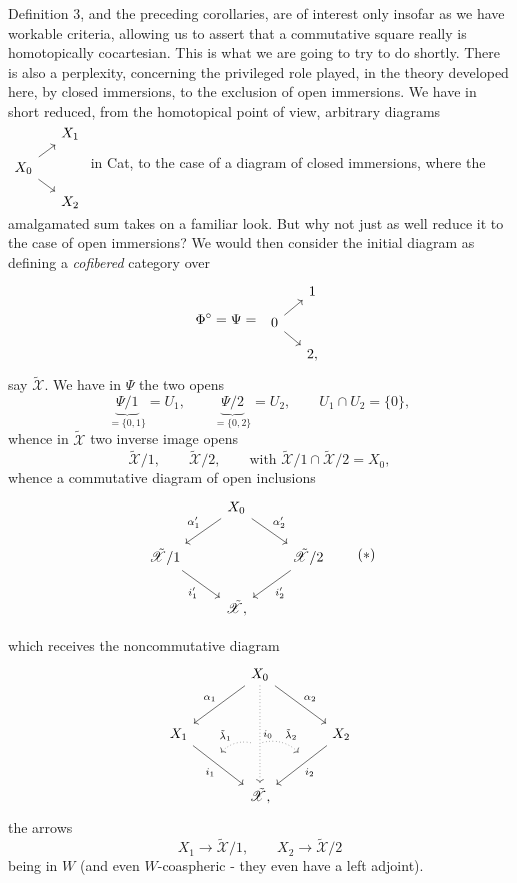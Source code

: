 \documentclass[11pt]{article}
\newcommand{\printedpage}[1]{\marginpar{\footnotesize p.~#1}}
\newcommand{\msp}[1]{\marginpar{\footnotesize [#1]}}
\newcommand{\tX}{\tilde{\mathscr{X}}}
\begin{document}
Definition 3, and the preceding corollaries, are of interest only insofar as we have workable criteria, allowing us to assert that a commutative square really is homotopically cocartesian. This is what we are going to try to do shortly. There is also a perplexity, concerning the privileged role played, in the theory developed here, by closed immersions, to the exclusion of open immersions. We have in short reduced, from the
\printedpage{91}
\msp{page 134}
homotopical point of view, arbitrary diagrams $\begin{tikzcd}[row sep=small, column sep=small]
 & X_1 \\
X_0 \arrow[ur] \arrow[dr] & \\
 & X_2
\end{tikzcd}$ in Cat, to the case of a diagram of closed immersions, where the amalgamated sum takes on a familiar look. But why not just as well reduce it to the case of open immersions? We would then consider the initial diagram as defining a \textit{cofibered} category over
\[
\Phi^{\circ} = \Psi = \
\begin{tikzcd}[row sep=small, column sep=small]
 & 1 \\
0 \arrow[ur] \arrow[dr] & \\
 & 2,
\end{tikzcd}
\]
say $\tX$. We have in $\Psi$ the two opens
\[
\underbrace{\Psi/1}_{=\{0,1\}} = U_1, \qquad \underbrace{\Psi/2}_{=\{0,2\}} = U_2, \qquad U_1 \cap U_2 = \{0\},
\]
whence in $\tX$ two inverse image opens
\[
\tX/1, \qquad \tX/2, \qquad \text{with } \tX/1 \cap \tX/2 = X_0,
\]
whence a commutative diagram of open inclusions
\[
\begin{tikzcd}
 & X_0 \arrow[dl, "\alpha'_1"'] \arrow[dr, "\alpha'_2"] & \\
\tX/1 \arrow[dr, "i'_1"'] & & \tX/2 \arrow[dl, "i'_2"] \\
 & \tX, &
\end{tikzcd}
\tag*{$(*)$}
\]

\msp{page 135}
which receives the noncommutative diagram
\[
\begin{tikzcd}[row sep=large, column sep=large]
 & X_0 \arrow[dl, "\alpha_1"'] \arrow[dr, "\alpha_2"] \arrow[dd, dotted, "i_0", ""'{name=J0, pos=0.6}] & \\
X_1 \arrow[dr, "i_1"', ""{name=J1, pos=0.4}] & & X_2 \arrow[dl, "i_2", ""'{name=J2, pos=0.4}] \\
 & \tX, &
\arrow[from=J0, to=J1, dotted, bend right, "\tilde{\lambda}_1"', shorten <=2pt, shorten >=2pt]
\arrow[from=J0, to=J2, dotted, bend left, "\tilde{\lambda}_2", shorten <=2pt, shorten >=2pt]
\end{tikzcd}
\]
\printedpage{92}
the arrows
\[
X_1 \longrightarrow \tX/1, \qquad X_2 \longrightarrow \tX/2
\]
being in $W$ (and even $W$-coaspheric - they even have a left adjoint).
\end{document}
